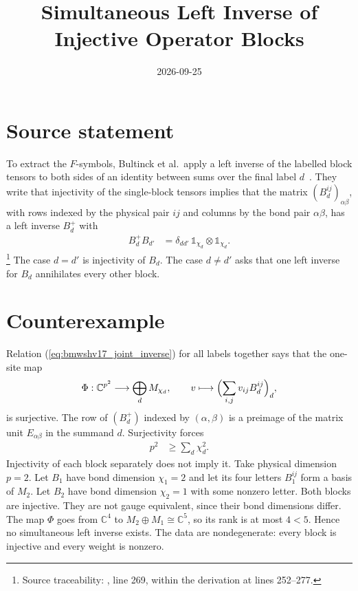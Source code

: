 \documentclass{article}
\title{Simultaneous Left Inverse of Injective Operator Blocks}
\author{}
\date{2026-09-25}
\begin{document}
\maketitle
{}

\section{Source statement}
To extract the $F$-symbols, Bultinck et al.\ apply a left inverse of the
labelled block tensors to both sides of an identity between sums over the
final label $d$~\cite{Bultinck2017Anyons}. They write that injectivity of the
single-block tensors implies that the matrix $(B_d^{ij})_{\alpha\beta}$, with
rows indexed by the physical pair $ij$ and columns by the bond pair
$\alpha\beta$, has a left inverse $B_d^+$ with
\begin{align}
    B_d^+B_{d'} & =\delta_{dd'}\,\mathbb 1_{\chi_d}\otimes\mathbb 1_{\chi_d}.
    \label{eq:bmwshv17_joint_inverse}
\end{align}
\footnote{Source traceability: ,
    line 269, within the derivation at lines 252--277.}
The case $d=d'$ is injectivity of $B_d$. The case $d\ne d'$ asks that one
left inverse for $B_d$ annihilates every other block.

\section{Counterexample}
Relation (\ref{eq:bmwshv17_joint_inverse}) for all labels together says
that the one-site map
\begin{align}
    \Phi:\mathbb C^{p^2}\longrightarrow\bigoplus_d M_{\chi_d},
    \qquad
    v\longmapsto\Bigl(\sum_{i,j}v_{ij}B_d^{ij}\Bigr)_d,
    \label{eq:bmwshv17_joint_map}
\end{align}
is surjective. The row of $(B_d^+)$ indexed by $(\alpha,\beta)$ is a preimage
of the matrix unit $E_{\alpha\beta}$ in the summand $d$. Surjectivity forces
\begin{align}
    p^2 & \ge\sum_d\chi_d^2 .
    \label{eq:bmwshv17_dimension_count}
\end{align}
Injectivity of each block separately does not imply it. Take physical
dimension $p=2$. Let $B_1$ have bond dimension $\chi_1=2$ and let its four
letters $B_1^{ij}$ form a basis of $M_2$. Let $B_2$ have bond dimension
$\chi_2=1$ with some nonzero letter. Both blocks are injective. They are not
gauge equivalent, since their bond dimensions differ. The map $\Phi$ goes from
$\mathbb C^4$ to $M_2\oplus M_1\cong\mathbb C^5$, so its rank is at most
$4<5$. Hence no simultaneous left inverse exists. The data are
nondegenerate: every block is injective and every weight is nonzero.
\end{document}
